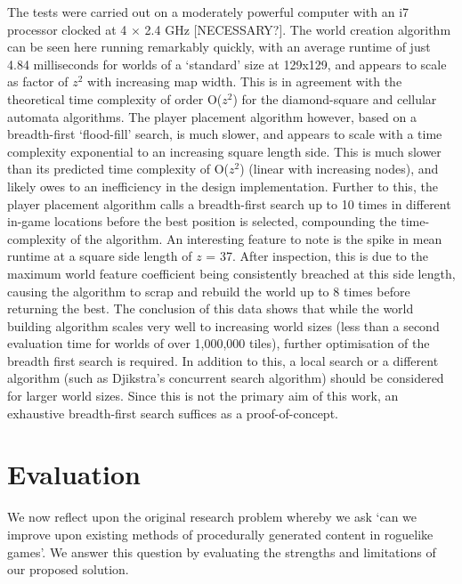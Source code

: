 \documentclass[12pt,a4paper]{article}
\begin{document}
The tests were carried out on a moderately powerful computer with an i7 processor clocked at 4 $\times$ 2.4 GHz [NECESSARY?]. The world creation algorithm can be seen here running remarkably quickly, with an average runtime of just 4.84 milliseconds for worlds of a `standard' size at 129x129, and appears to scale as factor of $z^2$ with increasing map width. This is in agreement with the theoretical time complexity of order O($z^2$) for the diamond-square and cellular automata algorithms. The player placement algorithm however, based on a breadth-first `flood-fill' search, is much slower, and appears to scale with a time complexity exponential to an increasing square length side. This is much slower than its predicted time complexity of O($z^2$) (linear with increasing nodes), and likely owes to an inefficiency in the design implementation. Further to this, the player placement algorithm calls a breadth-first search up to 10 times in different in-game locations before the best position is selected, compounding the time-complexity of the algorithm. An interesting feature to note is the spike in mean runtime at a square side length of $z$ = 37. After inspection, this is due to the maximum world feature coefficient being consistently breached at this side length, causing the algorithm to scrap and rebuild the world up to 8 times before returning the best. The conclusion of this data shows that while the world building algorithm scales very well to increasing world sizes (less than a second evaluation time for worlds of over 1,000,000 tiles), further optimisation of the breadth first search is required. In addition to this, a local search or a different algorithm (such as Djikstra's concurrent search algorithm) should be considered for larger world sizes. Since this is not the primary aim of this work, an exhaustive breadth-first search suffices as a proof-of-concept.


\section{Evaluation}





We now reflect upon the original research problem whereby we ask `can we improve upon existing methods of procedurally generated content in roguelike games'. We answer this question by evaluating the strengths and limitations of our proposed solution. 
\end{document}
